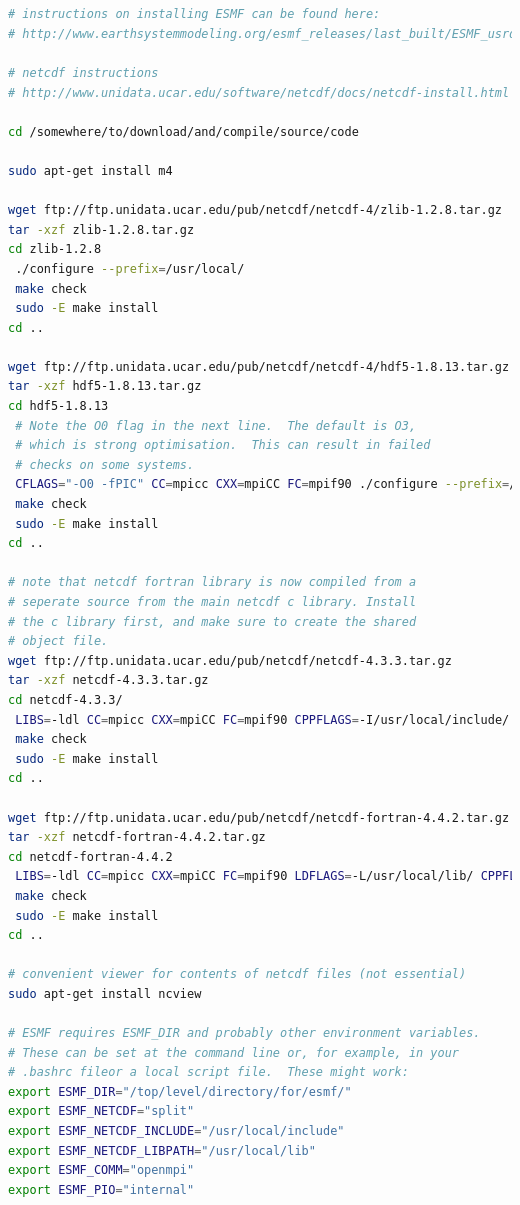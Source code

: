 \documentclass[11pt]{article}
\begin{document}
\begin{lstlisting}[language=bash]


# instructions on installing ESMF can be found here:
# http://www.earthsystemmodeling.org/esmf_releases/last_built/ESMF_usrdoc/node9.html

# netcdf instructions
# http://www.unidata.ucar.edu/software/netcdf/docs/netcdf-install.html

cd /somewhere/to/download/and/compile/source/code

sudo apt-get install m4

wget ftp://ftp.unidata.ucar.edu/pub/netcdf/netcdf-4/zlib-1.2.8.tar.gz
tar -xzf zlib-1.2.8.tar.gz 
cd zlib-1.2.8
 ./configure --prefix=/usr/local/
 make check
 sudo -E make install
cd ..

wget ftp://ftp.unidata.ucar.edu/pub/netcdf/netcdf-4/hdf5-1.8.13.tar.gz	
tar -xzf hdf5-1.8.13.tar.gz 
cd hdf5-1.8.13
 # Note the O0 flag in the next line.  The default is O3, 
 # which is strong optimisation.  This can result in failed 
 # checks on some systems.
 CFLAGS="-O0 -fPIC" CC=mpicc CXX=mpiCC FC=mpif90 ./configure --prefix=/usr/local/ --with-zlib=/usr/local  --enable-fortran --enable-parallel --enable-shared
 make check
 sudo -E make install
cd ..

# note that netcdf fortran library is now compiled from a 
# seperate source from the main netcdf c library. Install 
# the c library first, and make sure to create the shared
# object file. 
wget ftp://ftp.unidata.ucar.edu/pub/netcdf/netcdf-4.3.3.tar.gz
tar -xzf netcdf-4.3.3.tar.gz 
cd netcdf-4.3.3/
 LIBS=-ldl CC=mpicc CXX=mpiCC FC=mpif90 CPPFLAGS=-I/usr/local/include/ LDFLAGS=-L/usr/local/lib/  ./configure --prefix=/usr/local --enable-parallel 
 make check
 sudo -E make install
cd ..

wget ftp://ftp.unidata.ucar.edu/pub/netcdf/netcdf-fortran-4.4.2.tar.gz
tar -xzf netcdf-fortran-4.4.2.tar.gz 
cd netcdf-fortran-4.4.2
 LIBS=-ldl CC=mpicc CXX=mpiCC FC=mpif90 LDFLAGS=-L/usr/local/lib/ CPPFLAGS="-I/usr/local/include -DUSE_NETCDF4"  ./configure --prefix=/usr/local
 make check
 sudo -E make install
cd ..

# convenient viewer for contents of netcdf files (not essential)
sudo apt-get install ncview

# ESMF requires ESMF_DIR and probably other environment variables.  
# These can be set at the command line or, for example, in your 
# .bashrc fileor a local script file.  These might work:
export ESMF_DIR="/top/level/directory/for/esmf/"
export ESMF_NETCDF="split"
export ESMF_NETCDF_INCLUDE="/usr/local/include"
export ESMF_NETCDF_LIBPATH="/usr/local/lib"
export ESMF_COMM="openmpi"
export ESMF_PIO="internal"
                                                                                                              

\end{lstlisting}
\end{document}
